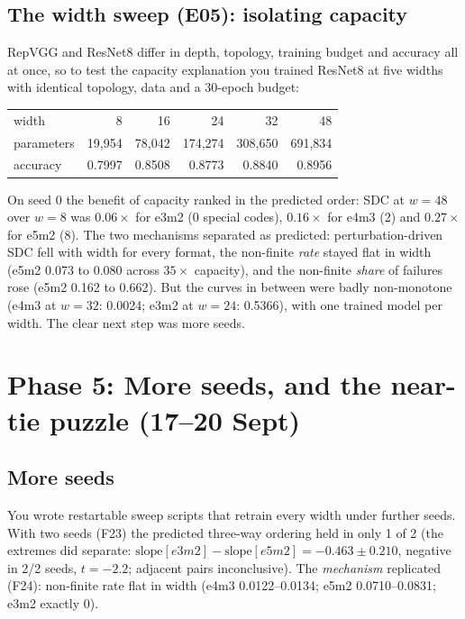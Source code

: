 \subsection{The width sweep (E05): isolating capacity}
RepVGG and ResNet8 differ in depth, topology, training budget and accuracy all at once, so to test the capacity explanation you trained ResNet8 at five widths with identical topology, data and a 30-epoch budget:
\begin{center}
\small
\begin{tabular}{lrrrrr}
\toprule
width & 8 & 16 & 24 & 32 & 48 \\
parameters & 19{,}954 & 78{,}042 & 174{,}274 & 308{,}650 & 691{,}834 \\
accuracy & 0.7997 & 0.8508 & 0.8773 & 0.8840 & 0.8956 \\
\bottomrule
\end{tabular}
\end{center}
On seed 0 the benefit of capacity ranked in the predicted order: SDC at $w=48$ over $w=8$ was $0.06\times$ for e3m2 (0 special codes), $0.16\times$ for e4m3 (2) and $0.27\times$ for e5m2 (8). The two mechanisms separated as predicted: perturbation-driven SDC fell with width for every format, the non-finite \emph{rate} stayed flat in width (e5m2 0.073 to 0.080 across $35\times$ capacity),
and the non-finite \emph{share} of failures rose (e5m2 0.162 to 0.662). But the curves in between were badly non-monotone (e4m3 at $w=32$: 0.0024; e3m2 at $w=24$: 0.5366), with one trained model per width. The clear next step was more seeds.

\section{Phase 5: More seeds, and the near-tie puzzle (17--20 Sept)}

\subsection{More seeds}
You wrote restartable sweep scripts that retrain every width under further seeds. With two seeds (F23) the predicted three-way ordering held in only 1 of 2 (the extremes did separate: $\text{slope}[e3m2]-\text{slope}[e5m2]=-0.463\pm0.210$, negative in 2/2 seeds, $t=-2.2$; adjacent pairs inconclusive).
The \emph{mechanism} replicated (F24): non-finite rate flat in width (e4m3 0.0122--0.0134; e5m2 0.0710--0.0831; e3m2 exactly 0).

